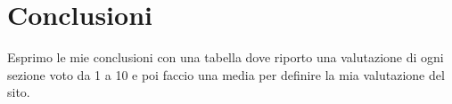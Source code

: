 \section{Conclusioni}
Esprimo le mie conclusioni con una tabella dove riporto una valutazione di ogni sezione voto da 1 a 10 e poi faccio una media per definire la mia valutazione del sito.